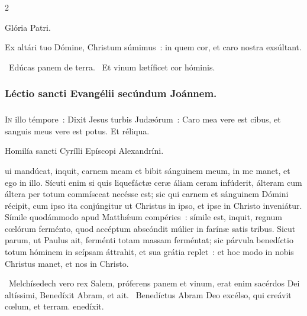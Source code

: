 \documentclass[9pt,twoside]{extarticle}
\begin{document}
\begin{multicols}{2}
{{Glória Patri.

\begin{tightlist}{}
\item {} Ex altári tuo Dómine, Christum súmimus~: in quem cor, et caro nostra exsúltant.
\item {}~Edúcas panem de terra. ~Et vinum lætíficet cor hóminis.
\end{tightlist}

\subsubsection*{\center Léctio sancti Evangélii secúndum Joánnem.}
\subsubsection*{\center {}}
\lettrine{I}n illo témpore~: Dixit Jesus turbis Judæórum~: Caro mea vere est cibus, et sanguis meus vere est potus. Et réliqua.

\begin{center}Homilía sancti Cyrílli Epíscopi Alexandríni.\\
 \end{center}
ui mandúcat, inquit, carnem meam et bibit sánguinem meum, in me manet, et ego in illo. Sícuti enim si quis liquefáctæ ceræ áliam ceram infúderit, álteram cum áltera per totum commísceat necésse est; sic qui carnem et sánguinem Dómini récipit, cum ipso ita conjúngitur ut Christus in ipso, et ipse in Christo inveniátur. Símile quodámmodo apud Matthǽum compéries~: símile est, inquit, regnum cœlórum ferménto, quod accéptum abscóndit múlier in farínæ satis tribus. Sicut parum, ut Paulus ait, ferménti totam massam ferméntat; sic párvula benedíctio totum hóminem in seípsam áttrahit, et sua grátia replet~: et hoc modo in nobis Christus manet, et nos in Christo.

\begin{tightlist}{}
\item {}~Melchísedech vero rex Salem, próferens panem et vinum, erat enim sacérdos Dei altíssimi, \textred{*} Benedíxit Abram, et ait. ~Benedíctus Abram Deo excélso, qui creávit cœlum, et terram. enedíxit.
\end{tightlist}

}}
\end{multicols}
\end{document}
